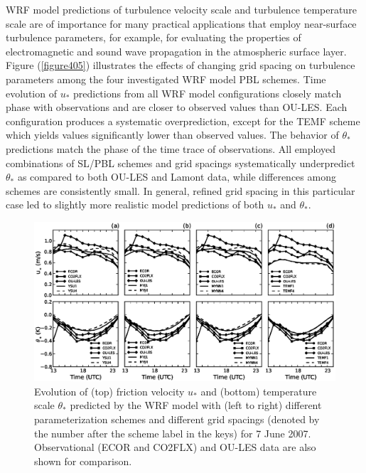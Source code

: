WRF model predictions of turbulence velocity scale and turbulence temperature scale are of importance for many practical applications that employ near-surface turbulence parameters, for example, for evaluating the properties of electromagnetic and sound wave propagation in the atmospheric surface layer. Figure (\autoref{figure405}) illustrates the effects of changing grid spacing on turbulence parameters among the four investigated WRF model PBL schemes. Time evolution of $u_*$ predictions from all WRF model configurations closely match phase with observations and are closer to observed values than OU-LES. Each configuration produces a systematic overprediction, except for the TEMF scheme which yields values significantly lower than observed values. The behavior of $\theta_*$ predictions match the phase of the time trace of observations. All employed combinations of SL\slash PBL schemes and grid spacings systematically underpredict $\theta_*$ as compared to both OU-LES and Lamont data, while differences among schemes are consistently small. In general, refined grid spacing in this particular case led to slightly more realistic model predictions of both $u_*$ and $\theta_*$. 


\begin{figure}[ht!]
\begin{center}
\includegraphics[width=\textwidth]{figures/chapter4/ust_tst_grid_20070607}
\end{center}
\caption{Evolution of (top) friction velocity $u_*$ and (bottom) temperature scale $\theta_*$ predicted by the WRF model with (left to right) different parameterization schemes and different grid spacings (denoted by the number after the scheme label in the keys) for 7 June 2007. Observational (ECOR and CO2FLX) and OU-LES data are also shown for comparison.}
\label{figure405}
\end{figure}


